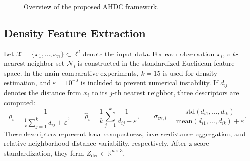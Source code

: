 \documentclass[twoside]{article}
\begin{document}
\begin{figure}[t]
	\centering

	\caption{Overview of the proposed AHDC framework.}
	\label{fig:pipeline}
\end{figure}

\subsection{Density Feature Extraction}
Let $\mathcal{X}=\{x_1,\ldots,x_n\}\subset\mathbb{R}^d$ denote the input data. For each observation $x_i$, a $k$-nearest-neighbor set $\mathcal{N}_i$ is constructed in the standardized Euclidean feature space. In the main comparative experiments, $k=15$ is used for density estimation, and $\varepsilon=10^{-8}$ is included to prevent numerical instability. If $d_{ij}$ denotes the distance from $x_i$ to its $j$-th nearest neighbor, three descriptors are computed:
\begin{equation}
	\rho_i=\frac{1}{\frac{1}{k}\sum_{j=1}^{k}d_{ij}+\varepsilon},\qquad
	\hat{\rho}_i=\frac{1}{k}\sum_{j=1}^{k}\frac{1}{d_{ij}+\varepsilon},\qquad
	\sigma_{\mathrm{cv},i}=\frac{\mathrm{std}(d_{i1},\ldots,d_{ik})}{\mathrm{mean}(d_{i1},\ldots,d_{ik})+\varepsilon}.
	\label{eq:density_features}
\end{equation}
These descriptors represent local compactness, inverse-distance aggregation, and relative neighborhood-distance variability, respectively. After z-score standardization, they form $Z_{\mathrm{den}}\in\mathbb{R}^{n\times3}$.
\end{document}

